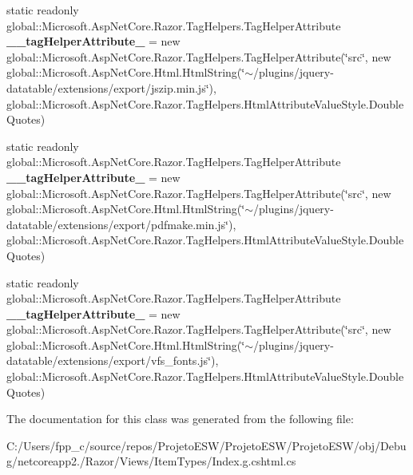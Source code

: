 \begin{DoxyCompactItemize}
\item 
\mbox{\label{class_asp_net_core_1_1_views___item_types___index_a5e1a9d73b741c44a1cc6b8b2609e6460}} 
static readonly global\+::\+Microsoft.\+Asp\+Net\+Core.\+Razor.\+Tag\+Helpers.\+Tag\+Helper\+Attribute {\bfseries \+\_\+\+\_\+tag\+Helper\+Attribute\+\_} = new global\+::\+Microsoft.\+Asp\+Net\+Core.\+Razor.\+Tag\+Helpers.\+Tag\+Helper\+Attribute(\char`\"{}src\char`\"{}, new global\+::\+Microsoft.\+Asp\+Net\+Core.\+Html.\+Html\+String(\char`\"{}$\sim$/plugins/jquery-\/datatable/extensions/export/jszip.\+min.\+js\char`\"{}), global\+::\+Microsoft.\+Asp\+Net\+Core.\+Razor.\+Tag\+Helpers.\+Html\+Attribute\+Value\+Style.\+Double\+Quotes)
\item 
\mbox{\label{class_asp_net_core_1_1_views___item_types___index_aeb6fea5c8aa429e970b8ed4e4ca98f5e}} 
static readonly global\+::\+Microsoft.\+Asp\+Net\+Core.\+Razor.\+Tag\+Helpers.\+Tag\+Helper\+Attribute {\bfseries \+\_\+\+\_\+tag\+Helper\+Attribute\+\_} = new global\+::\+Microsoft.\+Asp\+Net\+Core.\+Razor.\+Tag\+Helpers.\+Tag\+Helper\+Attribute(\char`\"{}src\char`\"{}, new global\+::\+Microsoft.\+Asp\+Net\+Core.\+Html.\+Html\+String(\char`\"{}$\sim$/plugins/jquery-\/datatable/extensions/export/pdfmake.\+min.\+js\char`\"{}), global\+::\+Microsoft.\+Asp\+Net\+Core.\+Razor.\+Tag\+Helpers.\+Html\+Attribute\+Value\+Style.\+Double\+Quotes)
\item 
\mbox{\label{class_asp_net_core_1_1_views___item_types___index_a00a0a0209a1d532b82c2956149e845e2}} 
static readonly global\+::\+Microsoft.\+Asp\+Net\+Core.\+Razor.\+Tag\+Helpers.\+Tag\+Helper\+Attribute {\bfseries \+\_\+\+\_\+tag\+Helper\+Attribute\+\_} = new global\+::\+Microsoft.\+Asp\+Net\+Core.\+Razor.\+Tag\+Helpers.\+Tag\+Helper\+Attribute(\char`\"{}src\char`\"{}, new global\+::\+Microsoft.\+Asp\+Net\+Core.\+Html.\+Html\+String(\char`\"{}$\sim$/plugins/jquery-\/datatable/extensions/export/vfs\+\_\+fonts.\+js\char`\"{}), global\+::\+Microsoft.\+Asp\+Net\+Core.\+Razor.\+Tag\+Helpers.\+Html\+Attribute\+Value\+Style.\+Double\+Quotes)
\end{DoxyCompactItemize}


The documentation for this class was generated from the following file\+:\begin{DoxyCompactItemize}
\item 
C\+:/\+Users/fpp\+\_\+c/source/repos/\+Projeto\+E\+S\+W/\+Projeto\+E\+S\+W/\+Projeto\+E\+S\+W/obj/\+Debug/netcoreapp2./\+Razor/\+Views/\+Item\+Types/Index.\+g.\+cshtml.\+cs\end{DoxyCompactItemize}
